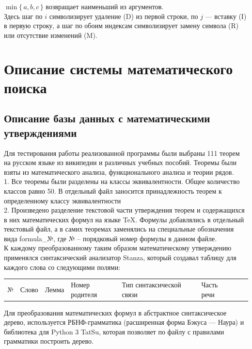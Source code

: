 \documentclass[12pt]{article}
\begin{document}
${\displaystyle \min\{\,a,b,c\,\}}$ возвращает наименьший из аргументов. \\

Здесь шаг по ${\displaystyle i}$ символизирует удаление (D) из первой строки, по ${\displaystyle j}$ — вставку (I) в первую строку, а шаг по обоим индексам символизирует замену символа (R) или отсутствие изменений (M). 
	
	
\newpage
\section{Описание системы математического поиска}
\subsection{Описание базы данных с математическими утверждениями}
Для тестирования работы реализованной программы были выбраны 111 теорем на русском языке из википедии и различных учебных пособий. Теоремы были взяты из математического анализа, функционального анализа и теории рядов. \\

1. Все теоремы были разделены на классы эквивалентности. Общее количество классов равно 50. В отдельный файл заносится принадлежность теорем к определенному классу эквивалентности\\

2. Произведено разделение текстовой части утверждения теорем и содержащихся в них математических формул на языке TeX. Формулы добавлялись в отдельный текстовый файл, а в самих теоремах заменялись на специальные обозначения вида formula\_№, где № --  порядковый номер формулы в данном файле.\\

К каждому преобразованному таким образом математическому утверждению применялся синтаксический анализатор Stanza, который создавал таблицу для каждого слова со следующими полями:

\begin{table}[h!]
\begin{tabular}{ l l l l l l l l }
№ & Слово & Лемма & Номер родителя & Тип синтаксической связи & Часть речи \\
\end{tabular}
\end{table} 

Для преобразования математических формул в абстрактное синтаксическое дерево, используется РБНФ-грамматика (расширенная форма Бэкуса — Наура) и библиотека для Python 3 TatSu, которая позволяет по файлу с правилами грамматики построить дерево. \\
\end{document}
